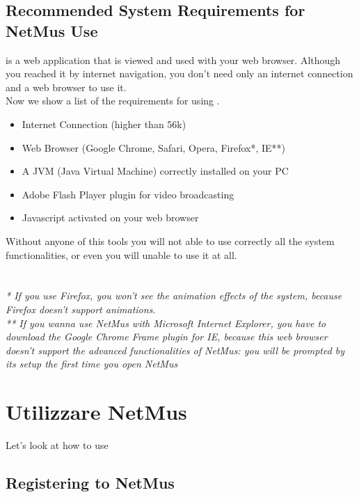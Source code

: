 \subsection{Recommended System Requirements for NetMus Use}
 is a web application that is viewed and used with your web browser.
Although you reached it by internet navigation, you don't need only an internet
connection and a web browser to use it.\\

Now we show a list of the requirements for using .

\begin{itemize}
  \item Internet Connection (higher than 56k)
  \item Web Browser (Google Chrome, Safari, Opera, Firefox*, IE**)
  \item A JVM (Java Virtual Machine) correctly installed on your PC
  \item Adobe Flash Player plugin for video broadcasting
  \item Javascript activated on your web browser
\end{itemize}

Without anyone of this tools you will not able to use
correctly all the system functionalities, or even you will unable to use
it at all.\\
\\
\\

\emph{* If you use Firefox, you won't see the animation effects of the
system, because Firefox doesn't support animations.}\\ 
\emph{** If you wanna use NetMus with Microsoft Internet Explorer, you have to
download the Google Chrome Frame plugin for IE, because this web browser doesn't
support the advanced functionalities of NetMus: you will be prompted by its
setup the first time you open NetMus}\\

\newpage
\section{Utilizzare NetMus}
Let's look at how to use 

\subsection{Registering to NetMus}

